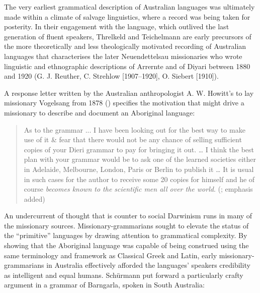 The very earliest grammatical description of Australian languages was ultimately made within a climate of salvage linguistics, where a record was being taken for posterity. In their engagement with the language, which outlived the last generation of fluent speakers, Threlkeld and Teichelmann are early precursors of the more theoretically and less theologically motivated recording of Australian languages that characterises the later Neuendettelsau missionaries who wrote linguistic and ethnographic descriptions of Arrernte and of Diyari between 1880 and 1920 (G. J. Reuther, C. Strehlow [1907--1920], O. Siebert [1910]).

A response letter written by the Australian anthropologist A. W. Howitt’s to lay missionary Vogelsang from 1878 () specifies the motivation that might drive a missionary to describe and document an Aboriginal language:

\begin{quote}
As to the grammar ... I have been looking out for the best way to make use of it \& fear that there would not be any chance of selling sufficient copies of your Dieri grammar to pay for bringing it out. … I think the best plan with your grammar would be to ask one of the learned societies either in Adelaide, Melbourne, London, Paris or Berlin to publish it … It is usual in such cases for the author to receive some 20 copies for himself and he of course \textit{becomes known to the scientific men all over the world}. (\citealt{howitt_vogelsang_nodate}; emphasis added)
\end{quote}

An undercurrent of thought that is counter to social Darwinism runs in many of the missionary sources. Missionary-grammarians sought to elevate the status of the “primitive” languages by drawing attention to grammatical complexity. By showing that the Aboriginal language was capable of being construed using the same terminology and framework as Classical Greek and Latin, early missionary-grammarians in Australia effectively afforded the languages' speakers credibility as intelligent and equal humans. Schürmann put forward a particularly crafty argument in a grammar of Barngarla, spoken in South Australia:


